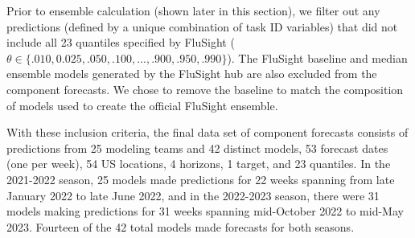 \documentclass[
  letterpaper,
  DIV=11,
  numbers=noendperiod]{scrartcl}
\begin{document}
Prior to ensemble calculation (shown later in this section), we filter
out any predictions (defined by a unique combination of task ID
variables) that did not include all 23 quantiles specified by FluSight
(\(\theta \in \{.010, 0.025, .050, .100, ..., .900, .950, .990\}\)). The
FluSight baseline and median ensemble models generated by the FluSight
hub are also excluded from the component forecasts. We chose to remove
the baseline to match the composition of models used to create the
official FluSight ensemble.

With these inclusion criteria, the final data set of component forecasts
consists of predictions from 25 modeling teams and 42 distinct models,
53 forecast dates (one per week), 54 US locations, 4 horizons, 1 target,
and 23 quantiles. In the 2021-2022 season, 25 models made predictions
for 22 weeks spanning from late January 2022 to late June 2022, and in
the 2022-2023 season, there were 31 models making predictions for 31
weeks spanning mid-October 2022 to mid-May 2023. Fourteen of the 42
total models made forecasts for both seasons.
\end{document}
